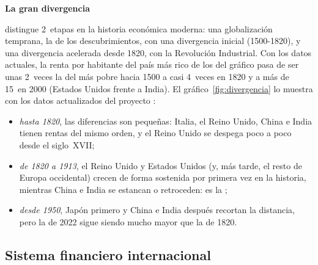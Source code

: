 \documentclass[11pt]{article}
\begin{document}
\begin{anotaciones}
\textbf{La gran divergencia}

 distingue 2~etapas en la historia económica moderna: una globalización temprana, la de los descubrimientos, con una divergencia inicial (1500-1820), y una divergencia acelerada desde 1820, con la Revolución Industrial. Con los datos actuales, la renta por habitante del país más rico de los del gráfico pasa de ser unas 2~veces la del más pobre hacia 1500 a casi 4~veces en 1820 y a más de 15~en 2000 (Estados Unidos frente a India). El gráfico~\ref{fig:divergencia} lo muestra con los datos actualizados del proyecto \nocite{BoltVanZanden2024Maddison}:
\begin{itemize}
\item \emph{hasta 1820}, las diferencias son pequeñas: Italia, el Reino Unido, China e India tienen rentas del mismo orden, y el Reino Unido se despega poco a poco desde el siglo~XVII;
\item \emph{de 1820 a 1913}, el Reino Unido y Estados Unidos (y, más tarde, el resto de Europa occidental) crecen de forma sostenida por primera vez en la historia, mientras China e India se estancan o retroceden: es la ;
\item \emph{desde 1950}, Japón primero y China e India después recortan la distancia, pero la de 2022 sigue siendo mucho mayor que la de 1820.
\end{itemize}
\begin{figuracaja}
\caption{La gran divergencia: PIB por habitante, 1500-2022}\label{fig:divergencia}
\end{figuracaja}
\end{anotaciones}

\subsection{Sistema financiero internacional}\label{sec:financiero1914}
\end{document}
